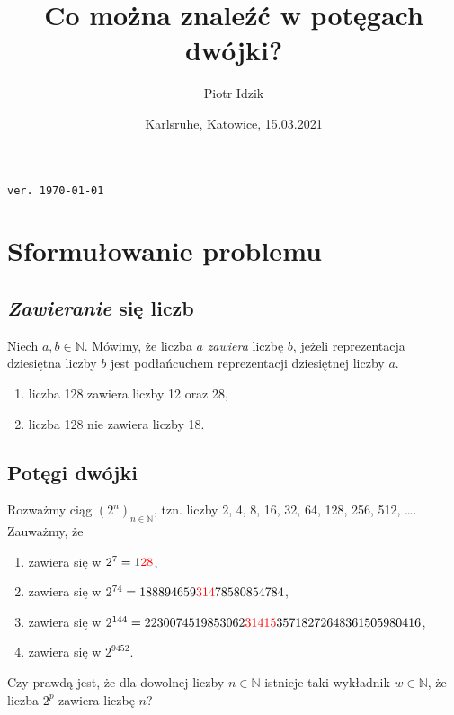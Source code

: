 \documentclass{beamer}
\author{Piotr Idzik}
\title{Co można znaleźć w potęgach dwójki?}
\date{Karlsruhe, Katowice, 15.03.2021}
\institute{blablabla}
\newcommand{\enumsymbol}{$\triangleright$}
\newcommand{\colora}[1]{{\color{red}{#1}}}
\newcommand{\N}{\mathbb{N}}
\newcommand{\define}[1]{\textit{#1}}
\begin{document}
\begin{frame}[plain]
\maketitle
\hfill \textcolor[rgb]{0.85,0.85,0.85}{\texttt{\tiny{ver. \today\ \currenttime\/}}}
\end{frame}
\section{Sformułowanie problemu}
\subsection{\define{Zawieranie} się liczb}
\begin{frame}
  \begin{definition}
    Niech $a, b \in \N$.
    Mówimy, że liczba $a$ \define{zawiera} liczbę $b$,
    jeżeli reprezentacja dziesiętna liczby $b$ jest podłańcuchem reprezentacji dziesiętnej liczby $a$.
  \end{definition}

  \begin{example}
    \begin{enumerate}[label=\enumsymbol]
      \item liczba 128 zawiera liczby 12 oraz 28,
      \item liczba 128 nie zawiera liczby 18.
    \end{enumerate}
  \end{example}
\end{frame}
\subsection{Potęgi dwójki}
\begin{frame}
  Rozważmy ciąg $(2^n)_{n \in \N}$, tzn. liczby 2, 4, 8, 16, 32, 64, 128, 256, 512, \ldots{}.
  Zauważmy, że
  \begin{enumerate}[label=\enumsymbol]
    \item \colora{28} zawiera się w $2^7 = 1\colora{28}$,
    \item \colora{314} zawiera się w $2^{74} = 188894659\colora{314}78580854784$,
    \item \colora{31415} zawiera się w $2^{144} = 2230074519853062\colora{31415}35718272648361505980416$,
    \item \colora{70000000} zawiera się w $2^{9452}$.
  \end{enumerate}
  Czy prawdą jest, że dla dowolnej liczby $n \in \N$ istnieje taki wykładnik $w \in \N$, że liczba $2^p$ zawiera liczbę $n$?
\end{frame}
\end{document}
